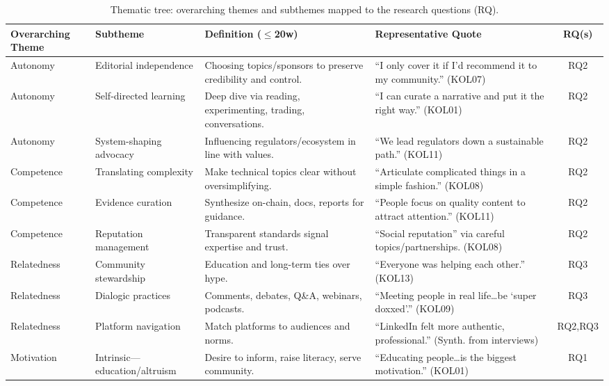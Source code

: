 \begin{table}[p]
    \centering
    \footnotesize
    \setlength{\tabcolsep}{3pt}
    \renewcommand{\arraystretch}{1.25}
    \caption{Thematic tree: overarching themes and subthemes mapped to the research questions (RQ).}
    \label{tab:thematic-tree}
    \begin{tabular}{@{} p{2.2cm} p{3cm} p{4.8cm} p{4.8cm} c @{}}
    \toprule
    \textbf{Overarching Theme} & \textbf{Subtheme} & \textbf{Definition ($\leq$20w)} & \textbf{Representative Quote} & \textbf{RQ(s)} \\
    \midrule
    Autonomy & Editorial independence & Choosing topics/sponsors to preserve credibility and control. & ``I only cover it if I'd recommend it to my community.'' (KOL07) & RQ2 \\
    Autonomy & Self-directed learning & Deep dive via reading, experimenting, trading, conversations. & ``I can curate a narrative and put it the right way.'' (KOL01) & RQ2 \\
    Autonomy & System-shaping advocacy & Influencing regulators/ecosystem in line with values. & ``We lead regulators down a sustainable path.'' (KOL11) & RQ2 \\
    \midrule
    Competence & Translating complexity & Make technical topics clear without oversimplifying. & ``Articulate complicated things in a simple fashion.'' (KOL08) & RQ2 \\
    Competence & Evidence curation & Synthesize on-chain, docs, reports for guidance. & ``People focus on quality content to attract attention.'' (KOL11) & RQ2 \\
    Competence & Reputation management & Transparent standards signal expertise and trust. & ``Social reputation'' via careful topics/partnerships. (KOL08) & RQ2 \\
    \midrule
    Relatedness & Community stewardship & Education and long-term ties over hype. & ``Everyone was helping each other.'' (KOL13) & RQ3 \\
    Relatedness & Dialogic practices & Comments, debates, Q\&A, webinars, podcasts. & ``Meeting people in real life\ldots be `super doxxed'.'' (KOL09) & RQ3 \\
    Relatedness & Platform navigation & Match platforms to audiences and norms. & ``LinkedIn felt more authentic, professional.'' (Synth. from interviews) & RQ2,RQ3 \\
    \midrule
    Motivation & Intrinsic—education/altruism & Desire to inform, raise literacy, serve community. & ``Educating people\ldots is the biggest motivation.'' (KOL01) & RQ1 \\

\end{tabular}
\end{table}
